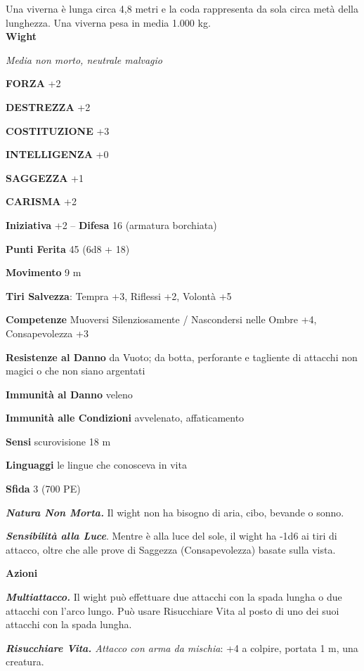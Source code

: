 \begin{multicols}{2}
Una viverna è lunga circa 4,8 metri e la coda rappresenta da sola circa metà della lunghezza. Una viverna pesa in media 1.000 kg.\\


\medskip{}\textbf{Wight}

\emph{Media non morto, neutrale malvagio}

\textbf{FORZA} +2

\textbf{DESTREZZA} +2

\textbf{COSTITUZIONE} +3

\textbf{INTELLIGENZA} +0

\textbf{SAGGEZZA} +1

\textbf{CARISMA} +2

\textbf{Iniziativa} +2 -- \textbf{Difesa} 16 (armatura borchiata)

\textbf{Punti Ferita} 45 (6d8 + 18)

\textbf{Movimento} 9 m

\textbf{Tiri Salvezza}: Tempra +3, Riflessi +2, Volontà +5

\textbf{Competenze} Muoversi Silenziosamente / Nascondersi nelle Ombre +4, Consapevolezza +3

\textbf{Resistenze al Danno} da Vuoto; da botta, perforante e tagliente di attacchi non magici o che non siano argentati

\textbf{Immunità al Danno} veleno

\textbf{Immunità alle Condizioni} avvelenato, affaticamento

\textbf{Sensi} scurovisione 18 m

\textbf{Linguaggi} le lingue che conosceva in vita

\textbf{Sfida} 3 (700 PE)

\emph{\textbf{Natura Non Morta.}} Il wight non ha bisogno di aria, cibo, bevande o sonno.

\emph{\textbf{Sensibilità alla Luce}}. Mentre è alla luce del sole, il wight ha -1d6 ai tiri di attacco, oltre che alle prove di Saggezza (Consapevolezza) basate sulla vista.

\textbf{Azioni}

\emph{\textbf{Multiattacco.}} Il wight può effettuare due attacchi con la spada lungha o due attacchi con l'arco lungo. Può usare Risucchiare Vita al posto di uno dei suoi attacchi con la spada lungha.

\emph{\textbf{Risucchiare Vita.} Attacco con arma da mischia}: +4 a colpire, portata 1 m, una creatura.


\end{multicols}
